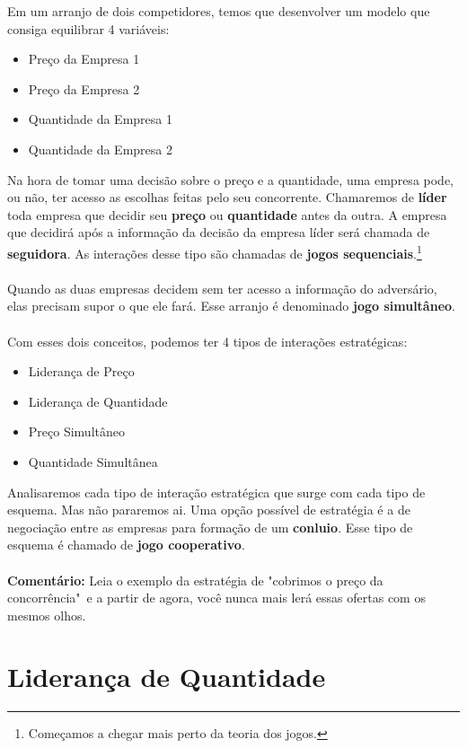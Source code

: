 \documentclass[a4paper,11pt,oneside]{book}
\theoremstyle{definition}
\theoremstyle{break}
\begin{document}
Em um arranjo de dois competidores, temos que desenvolver um modelo que consiga equilibrar 4 variáveis:

\begin{itemize}
	\item Preço da Empresa 1
	\item Preço da Empresa 2
	\item Quantidade da Empresa 1
	\item Quantidade da Empresa 2
\end{itemize}

Na hora de tomar uma decisão sobre o preço e a quantidade, uma empresa pode, ou não, ter acesso as escolhas feitas pelo seu concorrente. Chamaremos de \textbf{líder} toda empresa que decidir seu \textbf{preço} ou \textbf{quantidade} antes da outra. A empresa que decidirá após a informação da decisão da empresa líder será chamada de \textbf{seguidora}. As interações desse tipo são chamadas de \textbf{jogos sequenciais}.\footnote{Começamos a chegar mais perto da teoria dos jogos.}
\\~\\
Quando as duas empresas decidem sem ter acesso a informação do adversário, elas precisam supor o que ele fará. Esse arranjo é denominado \textbf{jogo simultâneo}.
\\~\\
Com esses dois conceitos, podemos ter 4 tipos de interações estratégicas:

\begin{itemize}
\item Liderança de Preço
\item Liderança de Quantidade
\item Preço Simultâneo
\item Quantidade Simultânea
\end{itemize}

Analisaremos cada tipo de interação estratégica que surge com cada tipo de esquema. Mas não pararemos ai. Uma opção possível de estratégia é a de negociação entre as empresas para formação de um \textbf{conluio}. Esse tipo de esquema é chamado de \textbf{jogo cooperativo}.
\\~\\
\textbf{Comentário:} Leia o exemplo da estratégia de "cobrimos o preço da concorrência"\ e a partir de agora, você nunca mais lerá essas ofertas com os mesmos olhos.

\section{Liderança de Quantidade}
\end{document}
